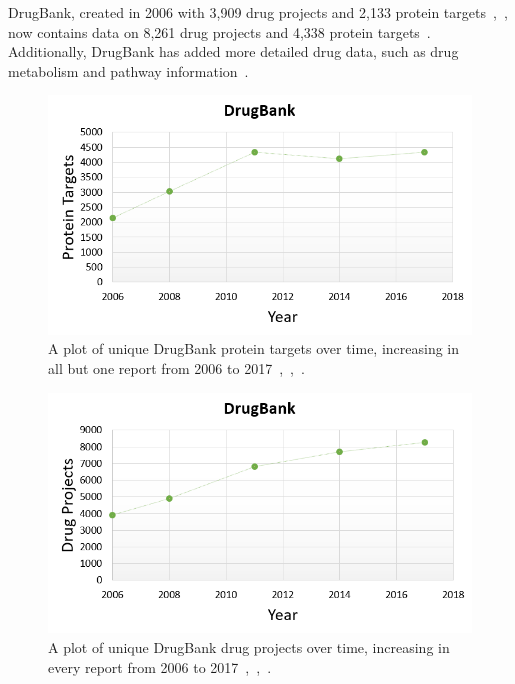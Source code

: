 \documentclass{IEEEtran}
\begin{document}
		DrugBank, created in 2006 with 3,909 drug projects and 2,133 protein targets~\cite{drugbank08},~\cite{drugbank06}, now contains data on 8,261 drug projects and 4,338 protein targets~\cite{drugbank14}.  Additionally, DrugBank has added more detailed drug data, such as drug metabolism and pathway information~\cite{drugbank14}.
		
		\begin{figure}[h]
			\centering
			\includegraphics[width=\linewidth]{dbprot}
			\caption{\footnotesize A plot of unique DrugBank protein targets over time, increasing in all but one report from 2006 to 2017~\cite{drugbank14},~\cite{drugbank08},~\cite{drugbank06}.}
			\label{dbprot}
		\end{figure}
		\begin{figure}[h]
			\centering
			\includegraphics[width=\linewidth]{dbdrug}
			\caption{\footnotesize A plot of unique DrugBank drug projects over time, increasing in every report from 2006 to 2017~\cite{drugbank14},~\cite{drugbank08},~\cite{drugbank06}.}
			\label{dbdrug}
		\end{figure}
		
\end{document}
